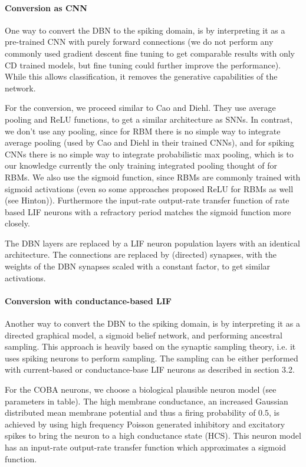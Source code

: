 \paragraph{Conversion as CNN} 

One way to convert the DBN to the spiking domain, is by interpreting it as a pre-trained CNN with purely forward connections (we do not perform any commonly used gradient descent fine tuning to get comparable results with only CD trained models, but fine tuning could further improve the performance).
While this allows classification, it removes the generative capabilities of the network.

For the conversion, we proceed similar to Cao and Diehl.
They use average pooling and ReLU functions, to get a similar architecture as SNNs.
In contrast, we don't use any pooling, since for RBM there is no simple way to integrate average pooling (used by Cao and Diehl in their trained CNNs), and for spiking CNNs there is no simple way to integrate probabilistic max pooling, which is to our knowledge currently the only training integrated pooling thought of for RBMs.
We also use the sigmoid function, since RBMs are commonly trained with sigmoid activations (even so some approaches proposed ReLU for RBMs as well (see Hinton)).
Furthermore the input-rate output-rate transfer function of rate based LIF neurons with a refractory period matches the sigmoid function more closely.

The DBN layers are replaced by a LIF neuron population layers with an identical architecture. 
The connections are replaced by (directed) synapses, with the weights of the DBN synapses scaled with a constant factor, to get similar activations.
 

\paragraph{Conversion with conductance-based LIF}

Another way to convert the DBN to the spiking domain, is by interpreting it as a directed graphical model, a sigmoid belief network, and performing ancestral sampling.
This approach is heavily based on the synaptic sampling theory, i.e. it uses spiking neurons to perform sampling.
The sampling can be either performed with current-based or conductance-base LIF neurons as described in section 3.2.

For the COBA neurons, we choose a biological plausible neuron model (see parameters in table). 
The high membrane conductance, an increased Gaussian distributed mean membrane potential and thus a firing probability of $0.5$, is achieved by using high frequency Poisson generated inhibitory and excitatory spikes to bring the neuron to a high conductance state (HCS). 
This neuron model has an input-rate output-rate transfer function which approximates a sigmoid function.

